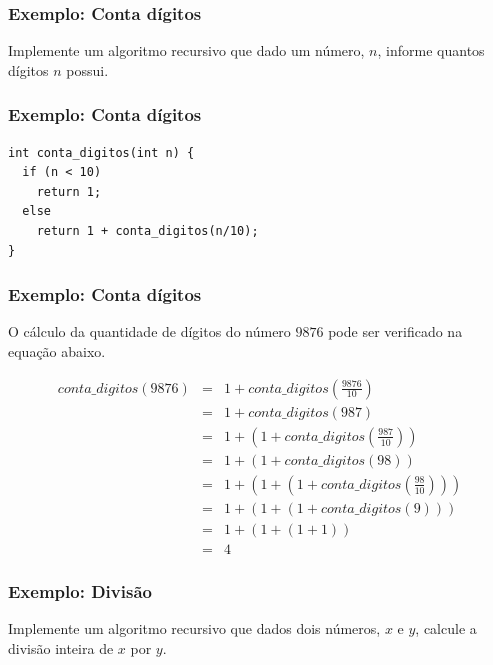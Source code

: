 \documentclass[aspectratio=169]{beamer}
\begin{document}

\begin{frame}
\frametitle{Exemplo: Conta dígitos}
Implemente um algoritmo recursivo que dado um número, $n$, informe quantos dígitos $n$ possui.
\end{frame}


\begin{frame}[fragile]
\frametitle{Exemplo: Conta dígitos}
\begin{lstlisting}
int conta_digitos(int n) {
  if (n < 10)
    return 1;  
  else 
    return 1 + conta_digitos(n/10);
}
\end{lstlisting}
\end{frame}


\begin{frame}[fragile]
\frametitle{Exemplo: Conta dígitos}
O cálculo da quantidade de dígitos do número $9876$ pode ser verificado na equação abaixo.

\begin{eqnarray}
  conta\_digitos(9876)&=& 1 + conta\_digitos(\frac{9876}{10}) \nonumber \\
                &=& 1 + conta\_digitos(987) \nonumber \\
	        &=& 1 + ( 1 + conta\_digitos(\frac{987}{10}) ) \nonumber \\
	        &=& 1 + ( 1 + conta\_digitos(98) ) \nonumber \\
	        &=& 1 + ( 1 + ( 1 + conta\_digitos(\frac{98}{10} ) ) ) \nonumber \\
	        &=& 1 + ( 1 + ( 1 + conta\_digitos(9) ) ) \nonumber \\
	        &=& 1 + ( 1 + ( 1 + 1 ) ) \nonumber \\
	        &=& 4 \nonumber 
\label{calculo_conta_digitos}
\end{eqnarray}
\end{frame}

\begin{frame}
\frametitle{Exemplo: Divisão}
Implemente um algoritmo recursivo que dados dois números, $x$ e $y$, calcule a divisão inteira de $x$ por $y$.
\end{frame}

\end{document}
